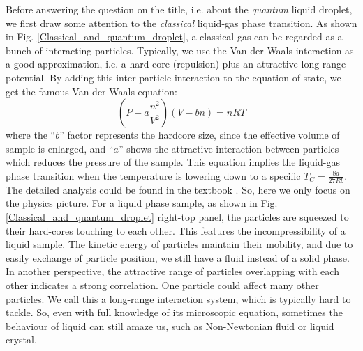 Before answering the question on the title, i.e. about the \textit{quantum} liquid droplet, we first draw some attention to the \textit{classical} liquid-gas phase transition. As shown in Fig. \ref{Classical_and_quantum_droplet}, a classical gas can be regarded as a bunch of interacting particles. Typically, we use the Van der Waals interaction as a good approximation, i.e. a hard-core (repulsion) plus an attractive long-range potential. By adding this inter-particle interaction to the equation of state, we get the famous Van der Waals equation:
\begin{equation}
\label{VdW equation}
(P+a\frac{n^2}{V^2})(V-bn)=nRT
\end{equation}
where the ``\(b\)'' factor represents the hardcore size, since the effective volume of sample is enlarged, and ``\(a\)'' shows the attractive interaction between particles which reduces the pressure of the sample. This equation implies the liquid-gas phase transition when the temperature is lowering down to a specific \(T_C=\frac{8a}{27Rb}\). The detailed analysis could be found in the textbook \cite{Cowan2005}. So, here we only focus on the physics picture. For a liquid phase sample, as shown in Fig. \ref{Classical_and_quantum_droplet} right-top panel, the particles are squeezed to their hard-cores touching to each other. This features the incompressibility of a liquid sample. The kinetic energy of particles maintain their mobility, and due to easily exchange of particle position, we still have a fluid instead of a solid phase. In another perspective, the attractive range of particles overlapping with each other indicates a strong correlation. One particle could affect many other particles. We call this a long-range interaction system, which is typically hard to tackle. So, even with full knowledge of its microscopic equation, sometimes the behaviour of liquid can still amaze us, such as Non-Newtonian fluid or liquid crystal.

